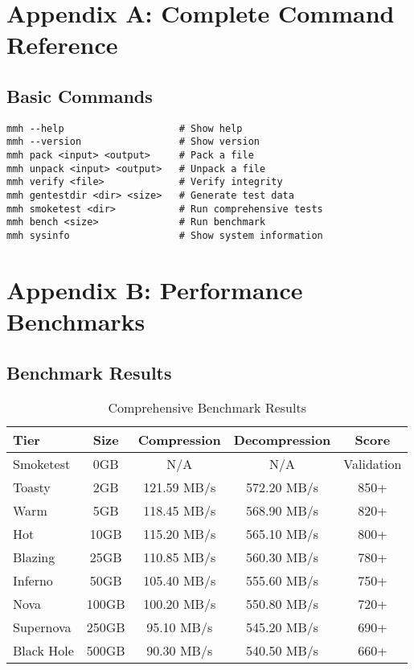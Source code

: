 \documentclass[12pt,a4paper]{article}
\begin{document}
\newpage

\appendix

\section{Appendix A: Complete Command Reference}
\subsection{Basic Commands}
\begin{lstlisting}[caption=Complete Command Reference]
mmh --help                    # Show help
mmh --version                 # Show version
mmh pack <input> <output>     # Pack a file
mmh unpack <input> <output>   # Unpack a file
mmh verify <file>             # Verify integrity
mmh gentestdir <dir> <size>   # Generate test data
mmh smoketest <dir>           # Run comprehensive tests
mmh bench <size>              # Run benchmark
mmh sysinfo                   # Show system information
\end{lstlisting}

\section{Appendix B: Performance Benchmarks}
\subsection{Benchmark Results}
\begin{table}[h]
\centering
\begin{tabular}{|l|c|c|c|c|}
\hline
\textbf{Tier} & \textbf{Size} & \textbf{Compression} & \textbf{Decompression} & \textbf{Score} \\
\hline
Smoketest & 0GB & N/A & N/A & Validation \\
Toasty & 2GB & 121.59 MB/s & 572.20 MB/s & 850+ \\
Warm & 5GB & 118.45 MB/s & 568.90 MB/s & 820+ \\
Hot & 10GB & 115.20 MB/s & 565.10 MB/s & 800+ \\
Blazing & 25GB & 110.85 MB/s & 560.30 MB/s & 780+ \\
Inferno & 50GB & 105.40 MB/s & 555.60 MB/s & 750+ \\
Nova & 100GB & 100.20 MB/s & 550.80 MB/s & 720+ \\
Supernova & 250GB & 95.10 MB/s & 545.20 MB/s & 690+ \\
Black Hole & 500GB & 90.30 MB/s & 540.50 MB/s & 660+ \\
\hline
\end{tabular}
\caption{Comprehensive Benchmark Results}
\end{table}
\end{document}
